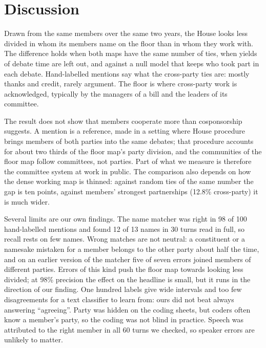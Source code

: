 
\section*{Discussion}

Drawn from the same members over the same two years, the House looks less divided in whom its members name on the
floor than in whom they work with. The difference holds when both maps have the same number of ties, when yields
of debate time are left out, and against a null model that keeps who took part in each debate. Hand-labelled
mentions say what the cross-party ties are: mostly thanks and credit, rarely argument. The floor is where
cross-party work is acknowledged, typically by the managers of a bill and the leaders of its committee.

The result does not show that members cooperate more than cosponsorship suggests. A mention is a reference, made
in a setting where House procedure brings members of both parties into the same debates; that procedure accounts
for about two thirds of the floor map's party division, and the communities of the floor map follow committees,
not parties. Part of what we measure is therefore the committee system at work in public. The comparison also
depends on how the dense working map is thinned: against random ties of the same number the gap is ten points,
against members' strongest partnerships (12.8\% cross-party) it is much wider.

Several limits are our own findings. The name matcher was right in 98 of 100 hand-labelled mentions and found 12
of 13 names in 30 turns read in full, so recall rests on few names. Wrong matches are not neutral: a constituent or a
namesake mistaken for a member belongs to the other party about half the time, and on an earlier version of the
matcher five of seven errors joined members of different parties. Errors of this kind push the floor map towards
looking less divided; at 98\% precision the effect on the headline is small, but it runs in the direction of our
finding. One hundred labels give wide intervals and too few
disagreements for a text classifier to learn from: ours did not beat always answering ``agreeing''. Party was hidden on the
coding sheets, but coders often know a member's party, so the coding was not blind in practice. Speech was
attributed to the right member in all 60 turns we checked, so speaker errors are unlikely to matter.


